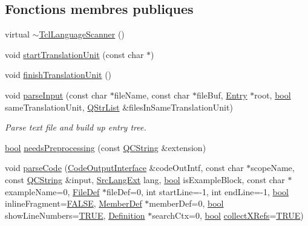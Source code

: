 \subsection*{Fonctions membres publiques}
\begin{DoxyCompactItemize}
\item 
virtual \hyperlink{class_tcl_language_scanner_ae6ab4b650937dd5cf8424b62eb256489}{$\sim$\+Tcl\+Language\+Scanner} ()
\item 
void \hyperlink{class_tcl_language_scanner_a60ddc698e1b483f71f4ce4ca4bffb512}{start\+Translation\+Unit} (const char $\ast$)
\item 
void \hyperlink{class_tcl_language_scanner_a187804b0bf0a0043bad0f1a752224909}{finish\+Translation\+Unit} ()
\item 
void \hyperlink{class_tcl_language_scanner_a0c1673d0753d4fa415de90aa7d875e0e}{parse\+Input} (const char $\ast$file\+Name, const char $\ast$file\+Buf, \hyperlink{class_entry}{Entry} $\ast$root, \hyperlink{qglobal_8h_a1062901a7428fdd9c7f180f5e01ea056}{bool} same\+Translation\+Unit, \hyperlink{class_q_str_list}{Q\+Str\+List} \&files\+In\+Same\+Translation\+Unit)
\begin{DoxyCompactList}\small\item\em Parse text file and build up entry tree. \end{DoxyCompactList}\item 
\hyperlink{qglobal_8h_a1062901a7428fdd9c7f180f5e01ea056}{bool} \hyperlink{class_tcl_language_scanner_ab3a4ec9c04dbcf8bb75cd1552c774f5e}{needs\+Preprocessing} (const \hyperlink{class_q_c_string}{Q\+C\+String} \&extension)
\item 
void \hyperlink{class_tcl_language_scanner_a25f39e49124e2201c4a12d7ff1247b30}{parse\+Code} (\hyperlink{class_code_output_interface}{Code\+Output\+Interface} \&code\+Out\+Intf, const char $\ast$scope\+Name, const \hyperlink{class_q_c_string}{Q\+C\+String} \&input, \hyperlink{types_8h_a9974623ce72fc23df5d64426b9178bf2}{Src\+Lang\+Ext} lang, \hyperlink{qglobal_8h_a1062901a7428fdd9c7f180f5e01ea056}{bool} is\+Example\+Block, const char $\ast$example\+Name=0, \hyperlink{class_file_def}{File\+Def} $\ast$file\+Def=0, int start\+Line=-\/1, int end\+Line=-\/1, \hyperlink{qglobal_8h_a1062901a7428fdd9c7f180f5e01ea056}{bool} inline\+Fragment=\hyperlink{qglobal_8h_a10e004b6916e78ff4ea8379be80b80cc}{F\+A\+L\+S\+E}, \hyperlink{class_member_def}{Member\+Def} $\ast$member\+Def=0, \hyperlink{qglobal_8h_a1062901a7428fdd9c7f180f5e01ea056}{bool} show\+Line\+Numbers=\hyperlink{qglobal_8h_a04a6422a52070f0dc478693da640242b}{T\+R\+U\+E}, \hyperlink{class_definition}{Definition} $\ast$search\+Ctx=0, \hyperlink{qglobal_8h_a1062901a7428fdd9c7f180f5e01ea056}{bool} \hyperlink{tclscanner_8cpp_ac23b94d6976d5bb0c9f1885c5a2e7a53}{collect\+X\+Refs}=\hyperlink{qglobal_8h_a04a6422a52070f0dc478693da640242b}{T\+R\+U\+E})

\end{DoxyCompactItemize}
